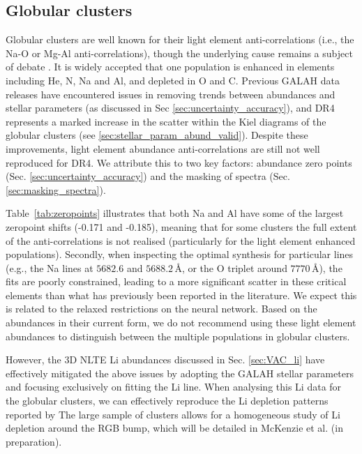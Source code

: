 \documentclass[
  journal=pasa,
  manuscript=research-paper, %
  year=2024,
  volume=37
]{cup-journal}
\begin{document}
\subsection{Globular clusters} \label{sec:caveats_globulars}

Globular clusters are well known for their light element anti-correlations (i.e., the Na-O or Mg-Al anti-correlations), though the underlying cause remains a subject of debate \citep[for recent reviews see][]{Bastian2018, Gratton2019, Milone2022}. It is widely accepted that one population is enhanced in elements including He, N, Na and Al, and depleted in O and C. Previous GALAH data releases have encountered issues in removing trends between abundances and stellar parameters (as discussed in Sec \ref{sec:uncertainty_accuracy}), and DR4 represents a marked increase in the scatter within the Kiel diagrams of the globular clusters (see \ref{sec:stellar_param_abund_valid}). Despite these improvements, light element abundance anti-correlations are still not well reproduced for DR4. We attribute this to two key factors: abundance zero points (Sec. \ref{sec:uncertainty_accuracy}) and the masking of spectra (Sec. \ref{sec:masking_spectra}).

Table~\ref{tab:zeropoints} illustrates that both Na and Al have some of the largest zeropoint shifts (-0.171 and -0.185), meaning that for some clusters the full extent of the anti-correlations is not realised (particularly for the light element enhanced populations). Secondly, when inspecting the optimal synthesis for particular lines (e.g., the Na lines at $5682.6$ and $5688.2\,\text{\AA}$, or the O triplet around $7770\,\text{\AA}$), the fits are poorly constrained, leading to a more significant scatter in these critical elements than what has previously been reported in the literature. We expect this is related to the relaxed restrictions on the neural network. Based on the abundances in their current form, we do not recommend using these light element abundances to distinguish between the multiple populations in globular clusters. 

However, the 3D NLTE Li abundances discussed in Sec. \ref{sec:VAC_li} have effectively mitigated the above issues by adopting the GALAH stellar parameters and focusing exclusively on fitting the Li line. When analysing this Li data for the globular clusters, we can effectively reproduce the Li depletion patterns reported by \citet{Lind2009b} The large sample of clusters allows for a homogeneous study of Li depletion around the RGB bump, which will be detailed in McKenzie et al. (in preparation).
\end{document}
